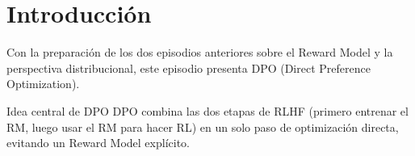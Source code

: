 \section{Introducción}
Con la preparación de los dos episodios anteriores sobre el Reward Model y la perspectiva distribucional, este episodio presenta DPO (Direct Preference Optimization).

\begin{importantbox}{Idea central de DPO}
DPO combina las dos etapas de RLHF (primero entrenar el RM, luego usar el RM para hacer RL) en un solo paso de optimización directa, evitando un Reward Model explícito.
\end{importantbox}

